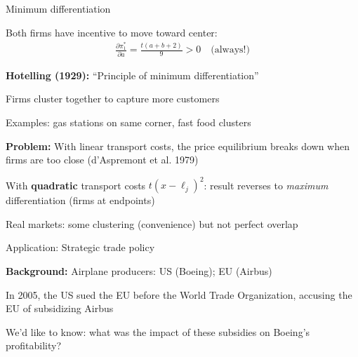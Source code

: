 \documentclass[notes,11pt, aspectratio=169]{beamer}
\newenvironment{wideitemize}{\itemize\addtolength{\itemsep}{10pt}}{\enditemize}
\begin{document}
\begin{frame}{Minimum differentiation}
	\begin{wideitemize}
		\item Both firms have incentive to move toward center:
		\begin{align*}
			\frac{\partial \pi_1^*}{\partial a} = \frac{t(a + b + 2)}{9} > 0 \quad \text{(always!)}
		\end{align*}
		\item \textbf{Hotelling (1929):} ``Principle of minimum differentiation''
		\begin{wideitemize}
			\vspace{5pt}
			\item Firms cluster together to capture more customers
			\item Examples: gas stations on same corner, fast food clusters
		\end{wideitemize}
		\item \textbf{Problem:} With linear transport costs, the price equilibrium breaks down when firms are too close (d'Aspremont et al. 1979)
		\item With \textbf{quadratic} transport costs $t(x - \ell_j)^2$: result reverses to \textit{maximum} differentiation (firms at endpoints)
		\item Real markets: some clustering (convenience) but not perfect overlap
	\end{wideitemize}
\end{frame}


\begin{frame}{Application: Strategic trade policy}
	\begin{wideitemize}
		\item \textbf{Background:} Airplane producers: US (Boeing); EU (Airbus)
		\item In 2005, the US sued the EU before the World Trade Organization, accusing the EU of subsidizing Airbus
		\item We'd like to know: what was the impact of these subsidies on Boeing's profitability?
	\end{wideitemize}
\end{frame}
\end{document}
